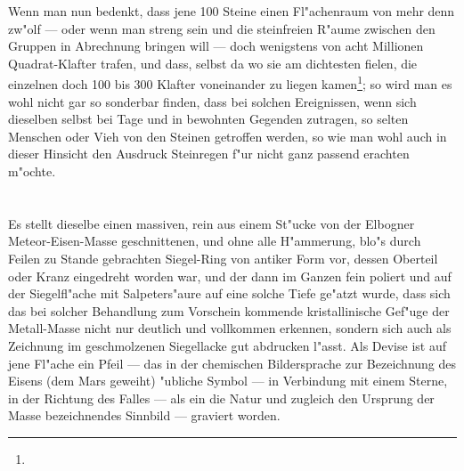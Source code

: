 \documentclass[a4paper, 11pt, oneside, german]{article}
\begin{document}
Wenn man nun bedenkt, dass jene 100 Steine einen Fl"achenraum von mehr denn zw"olf --- oder wenn man streng sein und die steinfreien R"aume zwischen den Gruppen in Abrechnung bringen will --- doch wenigstens von acht Millionen Quadrat-Klafter trafen, und dass, selbst da wo sie am dichtesten fielen, die einzelnen doch 100 bis 300 Klafter voneinander zu liegen kamen\footnote{}; so wird man es wohl nicht gar so sonderbar finden, dass bei solchen Ereignissen, wenn sich dieselben selbst bei Tage und in bewohnten Gegenden zutragen, so selten Menschen oder Vieh von den Steinen getroffen werden, so wie man wohl auch in dieser Hinsicht den Ausdruck Steinregen f"ur nicht ganz passend erachten m"ochte.
\clearpage
\section{}
\paragraph{}
Es stellt dieselbe einen massiven, rein aus einem St"ucke von der Elbogner Meteor-Eisen-Masse geschnittenen, und ohne alle H"ammerung, blo"s durch Feilen zu Stande gebrachten Siegel-Ring von antiker Form vor, dessen Oberteil oder Kranz eingedreht worden war, und der dann im Ganzen fein poliert und auf der Siegelfl"ache mit Salpeters"aure auf eine solche Tiefe ge"atzt wurde, dass sich das bei solcher Behandlung zum Vorschein kommende kristallinische Gef"uge der Metall-Masse nicht nur deutlich und vollkommen erkennen, sondern sich auch als Zeichnung im geschmolzenen Siegellacke gut abdrucken l"asst. Als Devise ist auf jene Fl"ache ein Pfeil --- das in der chemischen Bildersprache zur Bezeichnung des Eisens (dem Mars geweiht) "ubliche Symbol --- in Verbindung mit einem Sterne, in der Richtung des Falles --- als ein die Natur und zugleich den Ursprung der Masse bezeichnendes Sinnbild --- graviert worden.
\end{document}
